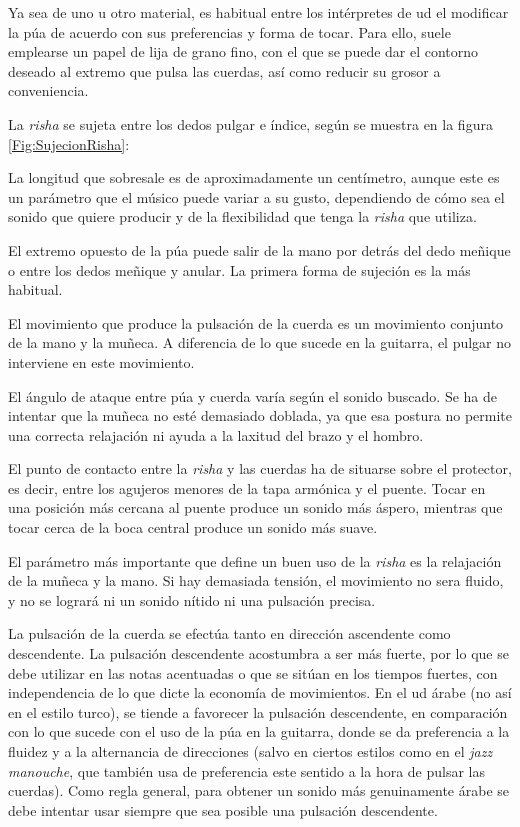 Ya sea de uno u otro material, es habitual entre los intérpretes de ud el modificar la púa de acuerdo con sus preferencias y forma de tocar. Para ello, suele emplearse un papel de lija de grano fino, con el que se puede dar el contorno deseado al extremo que pulsa las cuerdas, así como reducir su grosor a conveniencia.

La \emph{risha} se sujeta entre los dedos pulgar e índice, según se muestra en la figura \ref{Fig:SujecionRisha}:

La longitud que sobresale es de aproximadamente un centímetro, aunque este es un parámetro que el músico puede variar a su gusto, dependiendo de cómo sea el sonido que quiere producir y de la flexibilidad que tenga la \emph{risha} que utiliza.

El extremo opuesto de la púa puede salir de la mano por detrás del dedo meñique o entre los dedos meñique y anular. La primera forma de sujeción es la más habitual.

El movimiento que produce la pulsación de la cuerda es un movimiento conjunto de la mano y la muñeca. A diferencia de lo que sucede en la guitarra, el pulgar no interviene en este movimiento.

El ángulo de ataque entre púa y cuerda varía según el sonido buscado. Se ha de intentar que la muñeca no esté demasiado doblada, ya que esa postura no permite una correcta relajación ni ayuda a la laxitud del brazo y el hombro.

El punto de contacto entre la \emph{risha} y las cuerdas ha de situarse sobre el protector, es decir, entre los agujeros menores de la tapa armónica y el puente. Tocar en una posición más cercana al puente produce un sonido más áspero, mientras que tocar cerca de la boca central produce un sonido más suave.

El parámetro más importante que define un buen uso de la \emph{risha} es la relajación de la muñeca y la mano. Si hay demasiada tensión, el movimiento no sera fluido, y no se logrará ni un sonido nítido ni una pulsación precisa.

La pulsación de la cuerda se efectúa tanto en dirección ascendente como descendente. La pulsación descendente acostumbra a ser más fuerte, por lo que se debe utilizar en las notas acentuadas o que se sitúan en los tiempos fuertes, con independencia de lo que dicte la economía de movimientos. En el ud árabe (no así en el estilo turco), se tiende a favorecer la pulsación descendente, en comparación con lo que sucede con el uso de la púa en la guitarra, donde se da preferencia a la fluidez y a la alternancia de direcciones (salvo en ciertos estilos como en el \emph{jazz manouche}, que también usa de preferencia este sentido a la hora de pulsar las cuerdas). Como regla general, para obtener un sonido más genuinamente árabe se debe intentar usar siempre que sea posible una pulsación descendente.

